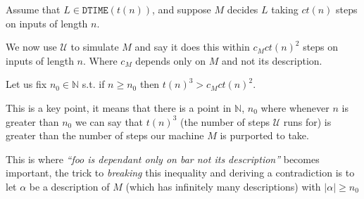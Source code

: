 \documentclass{article}
\newcommand{\N}{\mathbb{N}}
\begin{document}
Assume that $L \in \mathtt{DTIME}(t(n))$, and suppose $M$ decides $L$ taking $ct(n)$ steps on inputs of length $n$.

We now use $\mathcal{U}$ to simulate $M$ and say it does this within $c_{M}ct(n)^{2}$ steps on inputs of length $n$. Where $c_{M}$ depends only on $M$ and not its description.

Let us fix $n_{0} \in \N$ s.t. if $n \geq n_{0}$ then $t(n)^{3} > c_{M}ct(n)^{2}$.

This is a key point, it means that there is a point in $\N$, $n_{0}$ where whenever $n$ is greater than $n_{0}$ we can say that $t(n)^{3}$ (the number of steps $\mathcal{U}$ runs for) is greater than the number of steps our machine $M$ is purported to take.

This is where \textit{``foo is dependant only on bar not its description''} becomes important, the trick to \textit{breaking} this inequality and deriving a contradiction is to let \(\alpha\) be a description of $M$ (which has infinitely many descriptions) with $|\alpha| \geq n_{0}$
\end{document}

